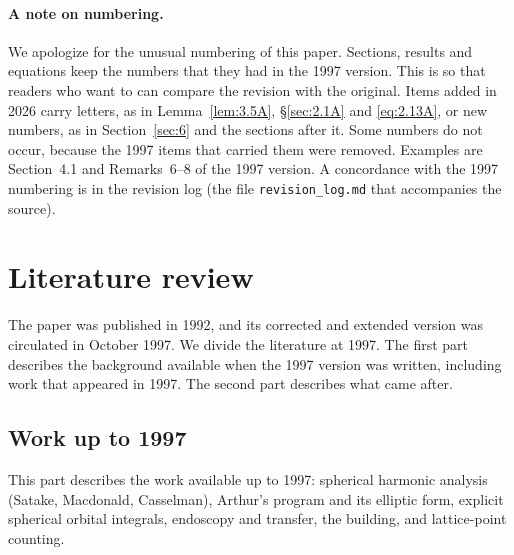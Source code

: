 \documentclass[12pt,letterpaper]{article}
\numberwithin{equation}{section}
\theoremstyle{plain}
\theoremstyle{remark}
\theoremstyle{plain}
\theoremstyle{definition}
\theoremstyle{remark}
\theoremstyle{remark}
\begin{document}
\paragraph{A note on numbering.} We apologize for the unusual numbering of this paper. Sections, results and equations keep the numbers that they had in the 1997 version. This is so that readers who want to can compare the revision with the original. Items added in 2026 carry letters, as in Lemma~\ref{lem:3.5A}, \S\ref{sec:2.1A} and \eqref{eq:2.13A}, or new numbers, as in Section~\ref{sec:6} and the sections after it. Some numbers do not occur, because the 1997 items that carried them were removed. Examples are Section~4.1 and Remarks~6--8 of the 1997 version. A concordance with the 1997 numbering is in the revision log (the file \texttt{revision\_log.md} that accompanies the source).

\section*{Literature review}\label{sec:lit}

The paper was published in 1992, and its corrected and extended version was circulated in October 1997. We divide the literature at 1997. The first part describes the background available when the 1997 version was written, including work that appeared in 1997. The second part describes what came after.

\subsection*{Work up to 1997}\label{sec:lit-before}

This part describes the work available up to 1997: spherical harmonic analysis (Satake, Macdonald, Casselman), Arthur's program and its elliptic form, explicit spherical orbital integrals, endoscopy and transfer, the building, and lattice-point counting.
\end{document}

